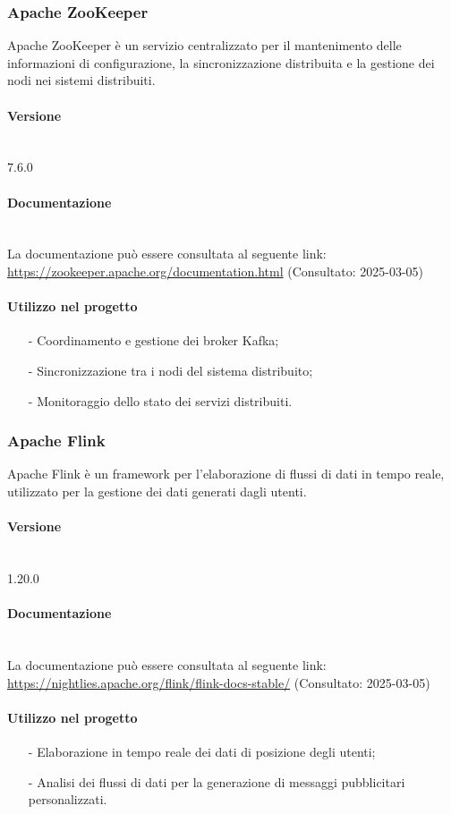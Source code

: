 \documentclass[10pt]{article}
\newcommand{\myparagraph}[1]{\paragraph{#1}\mbox{}\\\vspace{0.4em}}
\begin{document}
\begin{justify}
    \subsubsection{Apache ZooKeeper}
    Apache ZooKeeper è un servizio centralizzato per il mantenimento delle informazioni di configurazione, la sincronizzazione distribuita e la gestione dei nodi nei sistemi distribuiti.

    \myparagraph{Versione} 
    7.6.0

    \myparagraph{Documentazione} 
    La documentazione può essere consultata al seguente link: \textcolor{blue}{\url{https://zookeeper.apache.org/documentation.html}} (Consultato: 2025-03-05)

    \paragraph{Utilizzo nel progetto}
    \begin{itemize}
        \item[-] Coordinamento e gestione dei broker Kafka;
        \item[-] Sincronizzazione tra i nodi del sistema distribuito;
        \item[-] Monitoraggio dello stato dei servizi distribuiti.
    \end{itemize}

    \subsubsection{Apache Flink}
    Apache Flink è un framework per l'elaborazione di flussi di dati in tempo reale, utilizzato per la gestione dei dati generati dagli utenti.
    
    \myparagraph{Versione} 
    1.20.0 %
    
    \myparagraph{Documentazione} 
    La documentazione può essere consultata al seguente link: \textcolor{blue}{\url{https://nightlies.apache.org/flink/flink-docs-stable/}} (Consultato: 2025-03-05)
    
    \paragraph{Utilizzo nel progetto}
    \begin{itemize}
        \item[-] Elaborazione in tempo reale dei dati di posizione degli utenti;
        \item[-] Analisi dei flussi di dati per la generazione di messaggi pubblicitari personalizzati.
    \end{itemize}
    

\end{justify}
\end{document}
